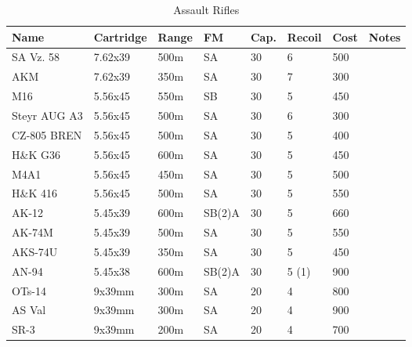 \begin{table}
  \caption{Assault Rifles}
  \begin{center}
    \begin{tabular}{| l | l | l | l | l | l | l | l |}
      \hline
      \textbf{Name} & \textbf{Cartridge} & \textbf{Range} &
      \textbf{FM} & \textbf{Cap.} & \textbf{Recoil} &
      \textbf{Cost} & \textbf{Notes} \\ \hline

      SA Vz. 58    & 7.62x39 & 500m & SA  & 30 & 6 & 500 & \\ \hline
      AKM          & 7.62x39 & 350m & SA  & 30 & 7 & 300 & \\ \hline

      M16          & 5.56x45 & 550m & SB  & 30 & 5 & 450 & \\ \hline
      Steyr AUG A3 & 5.56x45 & 500m & SA  & 30 & 6 & 300 & \\ \hline
      CZ-805 BREN  & 5.56x45 & 500m & SA  & 30 & 5 & 400 & \\ \hline
      H\&K G36     & 5.56x45 & 600m & SA  & 30 & 5 & 450 & \\ \hline
      M4A1         & 5.56x45 & 450m & SA  & 30 & 5 & 500 & \\ \hline
      H\&K 416     & 5.56x45 & 500m & SA  & 30 & 5 & 550 & \\ \hline

      AK-12        & 5.45x39 & 600m & SB(2)A & 30 & 5 & 660 & \\ \hline
      AK-74M       & 5.45x39 & 500m & SA     & 30 & 5 & 550 & \\ \hline
      AKS-74U      & 5.45x39 & 350m & SA     & 30 & 5 & 450 & \\ \hline
      AN-94        & 5.45x38 & 600m & SB(2)A & 30 & 5 (1) & 900 & \\ \hline

      OTs-14       & 9x39mm  & 300m & SA     & 20 & 4 & 800 & \\ \hline
      AS Val       & 9x39mm  & 300m & SA     & 20 & 4 & 900 & \\ \hline
      SR-3         & 9x39mm  & 200m & SA     & 20 & 4 & 700 & \\ \hline

    \end{tabular}
  \end{center}
\end{table}


